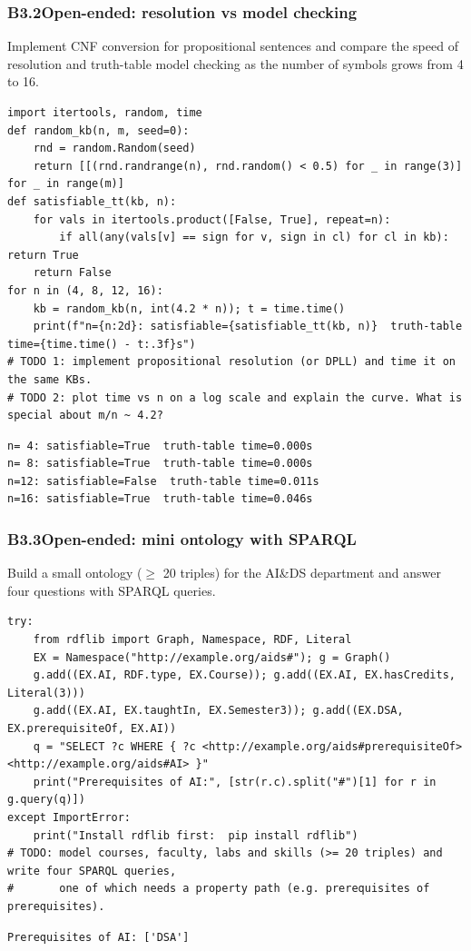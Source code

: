 \documentclass[11pt]{article}
\begin{document}
\subsubsection*{B3.2\quad Open-ended: resolution vs model checking}
Implement CNF conversion for propositional sentences and compare the speed of resolution and truth-table model checking as the number of symbols grows from 4 to 16.
\begin{lstlisting}[style=py]
import itertools, random, time
def random_kb(n, m, seed=0):
    rnd = random.Random(seed)
    return [[(rnd.randrange(n), rnd.random() < 0.5) for _ in range(3)] for _ in range(m)]
def satisfiable_tt(kb, n):
    for vals in itertools.product([False, True], repeat=n):
        if all(any(vals[v] == sign for v, sign in cl) for cl in kb): return True
    return False
for n in (4, 8, 12, 16):
    kb = random_kb(n, int(4.2 * n)); t = time.time()
    print(f"n={n:2d}: satisfiable={satisfiable_tt(kb, n)}  truth-table time={time.time() - t:.3f}s")
# TODO 1: implement propositional resolution (or DPLL) and time it on the same KBs.
# TODO 2: plot time vs n on a log scale and explain the curve. What is special about m/n ~ 4.2?
\end{lstlisting}
\begin{lstlisting}[style=out]
n= 4: satisfiable=True  truth-table time=0.000s
n= 8: satisfiable=True  truth-table time=0.000s
n=12: satisfiable=False  truth-table time=0.011s
n=16: satisfiable=True  truth-table time=0.046s
\end{lstlisting}
\subsubsection*{B3.3\quad Open-ended: mini ontology with SPARQL}
Build a small ontology ($\ge$ 20 triples) for the AI\&DS department and answer four questions with SPARQL queries.
\begin{lstlisting}[style=py]
try:
    from rdflib import Graph, Namespace, RDF, Literal
    EX = Namespace("http://example.org/aids#"); g = Graph()
    g.add((EX.AI, RDF.type, EX.Course)); g.add((EX.AI, EX.hasCredits, Literal(3)))
    g.add((EX.AI, EX.taughtIn, EX.Semester3)); g.add((EX.DSA, EX.prerequisiteOf, EX.AI))
    q = "SELECT ?c WHERE { ?c <http://example.org/aids#prerequisiteOf> <http://example.org/aids#AI> }"
    print("Prerequisites of AI:", [str(r.c).split("#")[1] for r in g.query(q)])
except ImportError:
    print("Install rdflib first:  pip install rdflib")
# TODO: model courses, faculty, labs and skills (>= 20 triples) and write four SPARQL queries,
#       one of which needs a property path (e.g. prerequisites of prerequisites).
\end{lstlisting}
\begin{lstlisting}[style=out]
Prerequisites of AI: ['DSA']
\end{lstlisting}
\newpage
{}
\end{document}
